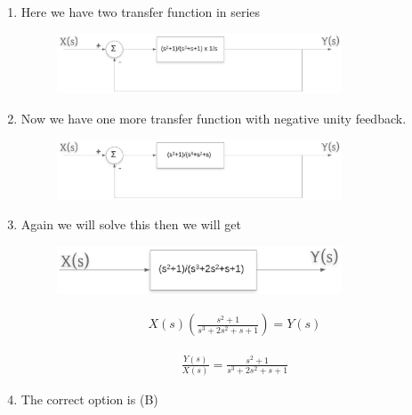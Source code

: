 \begin{enumerate}[label=\thesection.\arabic*.,ref=\thesection.\theenumi]
\item Here we have two transfer function in series 
\begin{figure}
\centering
\includegraphics[width=0.8\textwidth]{./figs/pic5.eps}
\caption{}
\label{fig:sec_order}
\end{figure}

\item Now we have one more transfer function with negative unity feedback.

\begin{figure}
\centering
\includegraphics[width=0.8\textwidth]{./figs/pic6.eps}
\caption{}
\label{fig:sec_order}
\end{figure}

\item Again we will solve this then we will get
\begin{figure}
\centering
\includegraphics[width=0.8\textwidth]{./figs/pic8.eps}
\caption{}
\label{fig:sec_order}
\end{figure}
\begin{align}
X(s)(\frac{s^2+1}{s^3+2s^2+s+1})=Y(s)
\end{align}

\begin{align}
\frac{Y(s)}{X(s)}=\frac{s^2+1}{s^3+2s^2+s+1}
\end{align}

\item The correct option is (B)

%
\end{enumerate}